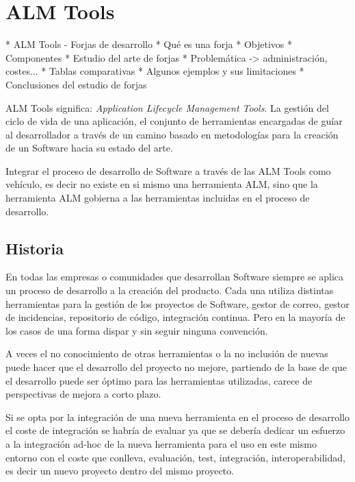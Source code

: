 \chapter{ALM Tools}
\label{chap:almtools}

* ALM Tools - Forjas de desarrollo
    * Qué es una forja
    * Objetivos
    * Componentes
        * Estudio del arte de forjas
    * Problemática -> administración, costes...
        * Tablas comparativas
    * Algunos ejemplos y sus limitaciones
    * Conclusiones del estudio de forjas

\par ALM Tools significa: \emph{Application Lifecycle Management Tools}. La gesti\'on del ciclo de vida de una aplicaci\'on, el conjunto de herramientas encargadas de gu\'iar al desarrollador a trav\'es de un camino basado en metodolog\'ias para la creaci\'on de un Software hacia su estado del arte.

\par Integrar el proceso de desarrollo de Software a trav\'es de las ALM Tools como veh\'iculo, es decir no existe en si mismo una herramienta ALM, sino que la herramienta ALM gobierna a las herramientas incluidas en el proceso de desarrollo.

\section{Historia}
\label{sec:historia}

\par En todas las empresas o comunidades que desarrollan Software siempre se aplica un proceso de desarrollo a la creación del producto. Cada una utiliza distintas herramientas para la gesti\'on de los proyectos de Software, gestor de correo, gestor de incidencias, repositorio de c\'odigo, integraci\'on continua. Pero en la mayor\'ia de los casos de una forma dispar y sin seguir ninguna convención.

\par A veces el no conocimiento de otras herramientas o la no inclusión de nuevas puede hacer que el desarrollo del proyecto no mejore, partiendo de la base de que el desarrollo puede ser óptimo para las herramientas utilizadas, carece de perspectivas de mejora a corto plazo.

\par Si se opta por la integración de una nueva herramienta en el proceso de desarrollo el coste de integración se habría de evaluar ya que se debería dedicar un esfuerzo a la integración ad-hoc de la nueva herramienta para el uso en este mismo entorno con el coste que conlleva, evaluación, test, integración, interoperabilidad, es decir un nuevo proyecto dentro del mismo proyecto.

